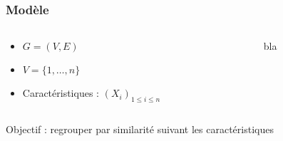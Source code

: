\documentclass[a4paper, c]{beamer}
\begin{document}
\begin{frame}
    \frametitle{Modèle}

    \begin{columns}
        \begin{column}{.5\textwidth}
            \begin{itemize}
                \item $G = (V, E)$
                \item $V = \{1,\ldots,n\}$
                \item Caractéristiques : $(X_i)_{1\leq i \leq n}$
            \end{itemize}
        \end{column}
        \begin{column}{.5\textwidth}
            bla
        \end{column}
    \end{columns}
    Objectif : regrouper par similarité suivant les caractéristiques
\end{frame}
\end{document}
